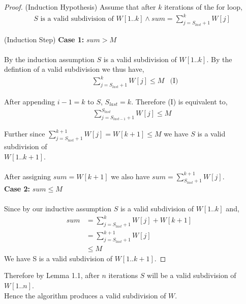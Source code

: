 \documentclass[12pt]{article}
\newenvironment{lemma}[2][Lemma]{\begin{trivlist}
\item[\hskip \labelsep {\bfseries #1}\hskip \labelsep {\bfseries #2.}]}{\end{trivlist}}
\newenvironment{question}[2][Question]{\begin{trivlist}
\item[\hskip \labelsep {\bfseries #1}\hskip \labelsep {\bfseries #2.}]}{\end{trivlist}}
\begin{document}
\begin{question}{1 (a)}
\begin{lemma}{1.1}
\begin{proof}
      (Induction Hypothesis) Assume that after $k$ iterations of the for loop,
      \begin{align*}
        S \text{ is a valid subdivision of } W[1..k] \land sum = \sum_{j = S_{last} + 1}^{k} W[j]
      \end{align*}

      (Induction Step)
      \textbf{Case 1:} $sum > M$ \\ \\
      By the induction assumption $S$ is a valid subdivision of $W[1..k]$.  By the defintion of
      a valid subdivision we thus have,
      \begin{align*}
        & \sum_{j = S_{last} + 1}^{k} W[j] \leq M & \text{(I)}
      \end{align*}

      After appending $i - 1 = k$ to $S$, $S_{last} = k$.  Therefore (I) is equivalent to,
      \begin{align*}
        \sum_{j = S_{last - 1} + 1}^{S_{last}} W[j] \leq M
      \end{align*}

      Further since $\sum_{j = S_{last} + 1}^{k+1} W[j] = W[k+1] \leq M$ we have
      $S$ is a valid subdivision of \\
      $W[1..k+1]$. \\ \\
      After assigning $sum = W[k + 1]$ we also have $sum = \sum_{S_{last} +1}^{k+1} W[j]$. \\

      \textbf{Case 2:} $sum \leq M$ \\ \\
      Since by our inductive assumption $S$ is a valid subdivision of $W[1..k]$ and,
      \begin{align*}
        sum & = \sum_{j=S_{last} + 1}^{k} W[j] + W[k+1] & \\
            & = \sum_{j=S_{last} + 1}^{k+1} W[j] & \\
            & \leq M &
      \end{align*}
      We have S is a valid subdivision of $W[1..k+1]$.
    \end{proof}

    Therefore by Lemma 1.1, after $n$ iterations $S$ will be a valid subdivision of
    $W[1..n]$. \\
    Hence the algorithm produces a valid subdivision of $W$.
  \end{lemma}


\end{question}
\end{document}
